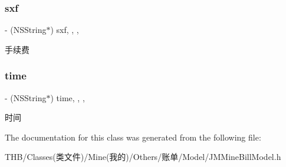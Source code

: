\subsubsection{\texorpdfstring{sxf}{sxf}}
{\footnotesize\ttfamily -\/ (N\+S\+String$\ast$) sxf\hspace{0.3cm}{\ttfamily [read]}, {\ttfamily [write]}, {\ttfamily [nonatomic]}, {\ttfamily [copy]}}

手续费 \mbox{\label{interface_j_m_mine_bill_model_a7dc28bbb1c308f64bb827b6eb770b2cf}} 
\subsubsection{\texorpdfstring{time}{time}}
{\footnotesize\ttfamily -\/ (N\+S\+String$\ast$) time\hspace{0.3cm}{\ttfamily [read]}, {\ttfamily [write]}, {\ttfamily [nonatomic]}, {\ttfamily [copy]}}

时间 

The documentation for this class was generated from the following file\+:\begin{DoxyCompactItemize}
\item 
T\+H\+B/\+Classes(类文件)/\+Mine(我的)/\+Others/账单/\+Model/J\+M\+Mine\+Bill\+Model.\+h\end{DoxyCompactItemize}

